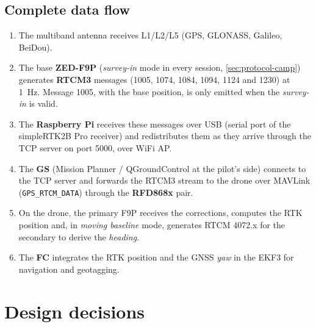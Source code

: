 \subsection{Complete data flow}

\begin{enumerate}[label=\arabic*.]
    \item The multiband antenna receives L1/L2/L5 (GPS, GLONASS, Galileo, BeiDou).
    \item The base \textbf{ZED-F9P} (\emph{survey-in} mode in every session, \cref{sec:protocol-camp}) generates \textbf{RTCM3} messages (1005, 1074, 1084, 1094, 1124 and 1230) at 1~Hz. Message 1005, with the base position, is only emitted when the \emph{survey-in} is valid.
    \item The \textbf{Raspberry Pi} receives these messages over USB (serial port of the simpleRTK2B Pro receiver) and redistributes them as they arrive through the TCP server on port 5000, over WiFi AP.
    \item The \textbf{GS} (Mission Planner / QGroundControl at the pilot's side) connects to the TCP server and forwards the RTCM3 stream to the drone over MAVLink (\texttt{GPS\_RTCM\_DATA}) through the \textbf{RFD868x} pair.
    \item On the drone, the primary F9P receives the corrections, computes the RTK position and, in \emph{moving baseline} mode, generates RTCM 4072.x for the secondary to derive the \emph{heading}.
    \item The \textbf{FC} integrates the RTK position and the GNSS \emph{yaw} in the EKF3 for navigation and geotagging.
\end{enumerate}

\section{Design decisions}
\label{sec:decisions}

